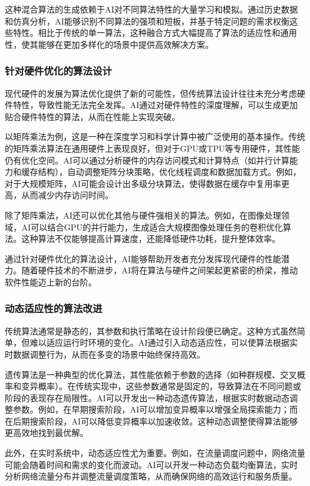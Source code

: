 \documentclass[supercite]{HustGraduPaper}
\begin{document}
这种混合算法的生成依赖于AI对不同算法特性的大量学习和模拟。通过历史数据和仿真分析，AI能够识别不同算法的强项和短板，并基于特定问题的需求权衡这些特性。相比于传统的单一算法，这种融合方式大幅提高了算法的适应性和通用性，使其能够在更加多样化的场景中提供高效解决方案。
	\subsubsection{\songti \bfseries 针对硬件优化的算法设计}
	现代硬件的发展为算法优化提供了新的可能性，但传统算法设计往往未充分考虑硬件特性，导致性能无法完全发挥。AI通过对硬件特性的深度理解，可以生成更加贴合硬件特性的算法，从而在性能上实现突破。

以矩阵乘法为例，这是一种在深度学习和科学计算中被广泛使用的基本操作。传统的矩阵乘法算法在通用硬件上表现良好，但对于GPU或TPU等专用硬件，其性能仍有优化空间。AI可以通过分析硬件的内存访问模式和计算特点（如并行计算能力和缓存结构），自动调整矩阵分块策略，优化线程调度和数据加载方式。例如，对于大规模矩阵，AI可能会设计出多级分块算法，使得数据在缓存中复用率更高，从而减少内存访问时间。

除了矩阵乘法，AI还可以优化其他与硬件强相关的算法。例如，在图像处理领域，AI可以结合GPU的并行能力，生成适合大规模图像处理任务的卷积优化算法。这种算法不仅能够提高计算速度，还能降低硬件功耗，提升整体效率。

通过针对硬件优化的算法设计，AI能够帮助开发者充分发挥现代硬件的性能潜力。随着硬件技术的不断进步，AI将在算法与硬件之间架起更紧密的桥梁，推动软件性能迈上新的台阶。
	\subsubsection{\songti \bfseries 动态适应性的算法改进}
	传统算法通常是静态的，其参数和执行策略在设计阶段便已确定。这种方式虽然简单，但难以适应运行时环境的变化。AI通过引入动态适应性，可以使算法根据实时数据调整行为，从而在多变的场景中始终保持高效。

遗传算法是一种典型的优化算法，其性能依赖于参数的选择（如种群规模、交叉概率和变异概率）。在传统实现中，这些参数通常是固定的，导致算法在不同问题或阶段的表现存在局限性。AI可以开发出一种动态遗传算法，根据实时数据动态调整参数。例如，在早期搜索阶段，AI可以增加变异概率以增强全局探索能力；而在后期搜索阶段，AI可以降低变异概率以加速收敛。这种动态调整使得算法能够更高效地找到最优解。

此外，在实时系统中，动态适应性尤为重要。例如，在流量调度问题中，网络流量可能会随着时间和需求的变化而波动。AI可以开发一种动态负载均衡算法，实时分析网络流量分布并调整流量调度策略，从而确保网络的高效运行和服务质量。
\end{document}
